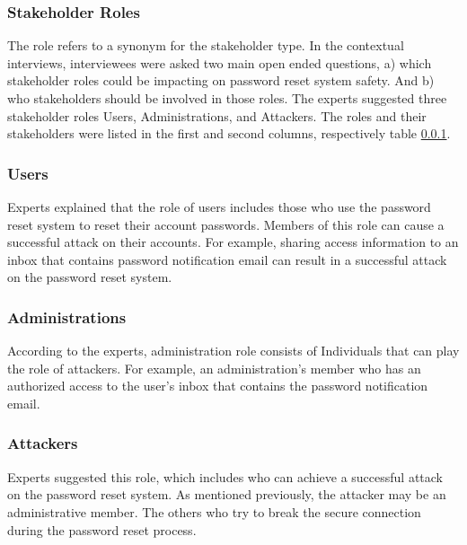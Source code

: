 \subsubsection{Stakeholder Roles}\label{Stakeholder Role}




The role refers to a synonym for the stakeholder type. In the contextual
interviews, interviewees were asked two main open ended questions, a)
which stakeholder roles could  be impacting on password reset system
safety. And b) who stakeholders should be involved in those roles. The
experts suggested three stakeholder roles Users, Administrations, and
Attackers. The roles and their stakeholders were listed in the first
and second columns, respectively table \ref{Stakeholder Role}.
  
\subsubsection*{Users}
Experts explained that the role of users includes those who use the
password reset system to reset their account passwords. Members of this
role can cause a successful attack on their accounts. For example, sharing
access information to an inbox that contains password notification email
can result in a successful attack on the password reset system.

\subsubsection*{Administrations}\label{admin} 
According to the experts, administration role consists of Individuals
that can play the role of attackers. For example, an administration's
member who has an authorized access to the user's inbox that contains
the password notification email.



\subsubsection*{Attackers}\label{attack} 

Experts suggested this role, which includes who can achieve a successful
attack on the password reset system. As mentioned previously, the attacker
may be an administrative member. The others who try to break the secure
connection during the password reset process.

